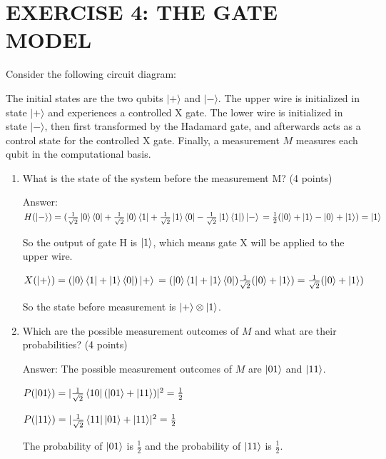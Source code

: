 \documentclass{article}
\begin{document}
\section{EXERCISE 4: THE GATE MODEL}
Consider the following circuit diagram:

The initial states are the two qubits $|+\rangle$ and $|-\rangle$. The upper wire is initialized in state $|+\rangle$ and experiences a controlled X gate. The lower wire is initialized in state $|-\rangle$, then first transformed by the Hadamard gate, and afterwards acts as a control state for the controlled X gate. Finally, a measurement $M$ measures each qubit in the computational basis.
\begin{enumerate}
    \item What is the state of the system before the measurement M? (4 points)

          Answer: $H(\ket{-})=(\frac{1}{\sqrt{2}}\ket{0}\bra{0}+\frac{1}{\sqrt{2}}\ket{0}\bra{1}+\frac{1}{\sqrt{2}}\ket{1}\bra{0}-\frac{1}{\sqrt{2}}\ket{1}\bra{1})\ket{-}
              \\=\frac{1}{2}(\ket{0}+\ket{1}-\ket{0}+\ket{1})
              \\=\ket{1}$

          So the output of gate H is $\ket{1}$, which means gate X will be applied to the upper wire.

          $X(\ket{+})=(\ket{0}\bra{1}+\ket{1}\bra{0})\ket{+}
              \\=(\ket{0}\bra{1}+\ket{1}\bra{0})\frac{1}{\sqrt{2}}(\ket{0}+\ket{1})
              \\=\frac{1}{\sqrt{2}}(\ket{0}+\ket{1})
          $

          So the state before measurement is $\ket{+} \otimes \ket{1}$.


    \item Which are the possible measurement outcomes of $M$ and what are their probabilities? (4 points)

          Answer: The possible measurement outcomes of $M$ are $\ket{01}$ and $\ket{11}$.

          $P(\ket{01})=|\frac{1}{\sqrt{2}}\bra{10}(\ket{01}+\ket{11})|^2
              =\frac{1}{2}
          $

          $P(\ket{11})=|\frac{1}{\sqrt{2}}\bra{11}{\ket{01}+\ket{11}}|^2
              =\frac{1}{2}
          $

          The probability of $\ket{01}$ is $\frac{1}{2}$ and the probability of $\ket{11}$ is $\frac{1}{2}$.




\end{enumerate}
\end{document}
